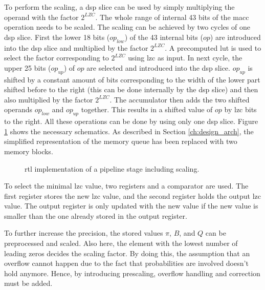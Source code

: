 \documentclass[mscthesis]{usiinfthesis}
\begin{document}
To perform the scaling, a \gls{dsp} slice can be used by simply multiplying the
operand with the factor $2^{LZC}$. The whole range of internal 43 bits of the
\gls{macc} operation needs to be scaled. The scaling can be achieved by two
cycles of one \gls{dsp} slice. First the lower 18 bits ($op_{low}$) of the 43
internal bits ($op$) are introduced into the \gls{dsp} slice and multiplied by
the factor $2^{LZC}$. A precomputed \gls{lut} is used to select the factor
corresponding to $2^{LZC}$ using \gls{lzc} as input. In next cycle, the upper
25 bits ($op_{up}$) of $op$ are selected and introduced into the
\gls{dsp} slice. $op_{up}$ is shifted by a constant amount of bits
corresponding to the width of the lower part shifted before to the right (this
can be done internally by the \gls{dsp} slice) and then also multiplied by the
factor $2^{LZC}$. The accumulator then adds the two shifted operands $op_{low}$
and $op_{up}$ together. This results in a shifted value of $op$ by \gls{lzc}
bits to the right. All these operations can be done by using only one
\gls{dsp} slice. Figure \ref{fig:arch_step_scale} shows the necessary
schematics. As described in Section \ref{ch:design_arch}, the simplified
representation of the memory queue has been replaced with two memory blocks.

\begin{figure}
    \centering
    
    \caption{\acrshort{rtl} implementation of a pipeline stage including
        scaling.}
    \label{fig:arch_step_scale}
\end{figure}

To select the minimal \gls{lzc} value, two registers and a comparator are used.
The first register stores the new \gls{lzc} value, and the second register holds
the output \gls{lzc} value. The output register is only updated with the new
value if the new value is smaller than the one already stored in the output
register.

To further increase the precision, the stored values $\pi$, $B$, and $Q$ can be
preprocessed and scaled. Also here, the element with the lowest number of
leading zeros decides the scaling factor. By doing this, the assumption that an
overflow cannot happen due to the fact that probabilities are involved doesn't
hold anymore. Hence, by introducing prescaling, overflow handling and
correction must be added.

\end{document}
